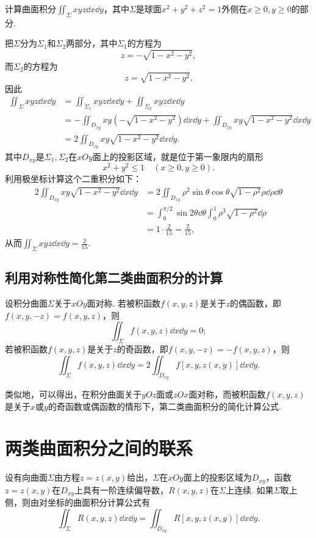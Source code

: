 \begin{example}
计算曲面积分\(\iint_{\Sigma} xyz \dd{x}\dd{y}\)，其中\(\Sigma\)是球面\(x^2+y^2+z^2=1\)外侧在\(x\geqslant0,y\geqslant0\)的部分.
\begin{solution}
把\(\Sigma\)分为\(\Sigma_1\)和\(\Sigma_2\)两部分，其中\(\Sigma_1\)的方程为\[
z = -\sqrt{1-x^2-y^2},
\]而\(\Sigma_2\)的方程为\[
z = \sqrt{1-x^2-y^2}.
\]因此\begin{align*}
\iint_{\Sigma} xyz \dd{x}\dd{y}
&= \iint_{\Sigma_1} xyz \dd{x}\dd{y}
+ \iint_{\Sigma_2} xyz \dd{x}\dd{y} \\
&= -\iint_{D_{xy}} xy (-\sqrt{1-x^2-y^2}) \dd{x}\dd{y}
+ \iint_{D_{xy}} xy \sqrt{1-x^2-y^2} \dd{x}\dd{y} \\
&= 2 \iint_{D_{xy}} xy \sqrt{1-x^2-y^2} \dd{x}\dd{y}.
\end{align*}
其中\(D_{xy}\)是\(\Sigma_1,\Sigma_2\)在\(xOy\)面上的投影区域，就是位于第一象限内的扇形\[
x^2+y^2\leqslant1 \quad(x\geqslant0,y\geqslant0).
\]利用极坐标计算这个二重积分如下：\begin{align*}
2 \iint_{D_{xy}} xy \sqrt{1-x^2-y^2} \dd{x}\dd{y}
&= 2 \iint_{D_{xy}} \rho^2 \sin\theta \cos\theta \sqrt{1-\rho^2} \rho\dd{\rho}\dd{\theta} \\
&= \int_0^{\pi/2} \sin2\theta \dd{\theta} \int_0^1 \rho^3 \sqrt{1-\rho^2} \dd{\rho} \\
&= 1 \cdot \frac{2}{15} = \frac{2}{15},
\end{align*}
从而\(\iint_{\Sigma} xyz \dd{x}\dd{y} = \frac{2}{15}\).
\end{solution}
\end{example}

\subsection{利用对称性简化第二类曲面积分的计算}
设积分曲面\(\Sigma\)关于\(xOy\)面对称.
若被积函数\(f(x,y,z)\)是关于\(z\)的偶函数，即\(f(x,y,-z) = f(x,y,z)\)，则\[
\iint_{\Sigma} f(x,y,z) \dd{x}\dd{y} = 0;
\]若被积函数\(f(x,y,z)\)是关于\(z\)的奇函数，即\(f(x,y,-z) = -f(x,y,z)\)，则\[
\iint_{\Sigma} f(x,y,z) \dd{x}\dd{y} = 2 \iint_{D_{xy}} f[x,y,z(x,y)] \dd{x}\dd{y}.
\]

类似地，可以得出，在积分曲面关于\(yOz\)面或\(zOx\)面对称，而被积函数\(f(x,y,z)\)是关于\(x\)或\(y\)的奇函数或偶函数的情形下，第二类曲面积分的简化计算公式.

\section{两类曲面积分之间的联系}
设有向曲面\(\Sigma\)由方程\(z = z(x,y)\)给出，\(\Sigma\)在\(xOy\)面上的投影区域为\(D_{xy}\)，函数\(z = z(x,y)\)在\(D_{xy}\)上具有一阶连续偏导数，\(R(x,y,z)\)在\(\Sigma\)上连续.
如果\(\Sigma\)取上侧，则由对坐标的曲面积分计算公式有\[
\iint_{\Sigma} R(x,y,z) \dd{x}\dd{y} = \iint_{D_{xy}} R[x,y,z(x,y)] \dd{x}\dd{y}.
\]

